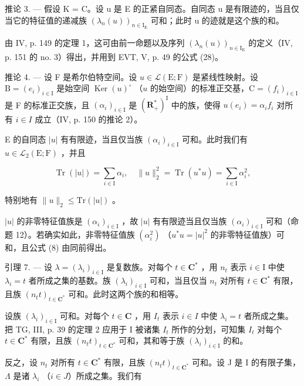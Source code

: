 推论 3. --- 假设 K = C。设 u 是 E 的正紧自同态。自同态 u 是有限迹的，当且仅当它的特征值的递减族 \((\lambda_{n}(u))_{n\in\mathrm{I}_{\mathrm{E}}}\) 可和；此时 u 的迹就是这个族的和。

由 IV, p. 149 的定理 1，这可由前一命题以及序列 \((\lambda_n(u))_{n\in \mathrm{I_E}}\) 的定义（IV, p. 151 的 no. 3）得出，并用到 EVT, V, p. 49 的公式 (28)。

推论 4. --- 设 F 是希尔伯特空间。设 \(u \in \mathcal{L}(\mathrm{E};\mathrm{F})\) 是紧线性映射。设 \(\mathrm{B} = (e_i)_{i \in \mathrm{I}}\) 是始空间 \(\operatorname{Ker}(u)^{\circ}\) （\(u\) 的始空间）的标准正交基，\(\mathrm{C} = (f_i)_{i \in \mathrm{I}}\) 是 F 的标准正交族，且 \((\alpha_{i})_{i\in\mathrm{I}}\) 是 \((\mathbf{R}_{+}^{*})^{\mathrm{I}}\) 中的族，使得 \(u(e_{i})=\alpha_{i}f_{i}\) 对所有 \(i\in I\) 成立（IV, p. 150 的推论 2）。

E 的自同态 \(|u|\) 有有限迹，当且仅当族 \((\alpha_{i})_{i\in \mathrm{I}}\) 可和。此时我们有 \(u\in \mathcal{L}_2(\mathrm{E};\mathrm{F})\) ，并且

\[
\operatorname{Tr} (| u |) = \sum_ {i \in \mathrm{I}} \alpha_ {i}, \quad \| u \| _ {2} ^ {2} = \operatorname{Tr} (u ^ {*} u) = \sum_ {i \in \mathrm{I}} \alpha_ {i} ^ {2},\tag{8}
\]

特别地有 \(\|u\|_{2}\leqslant\mathrm{Tr}(|u|)\) 。

\(|u|\) 的非零特征值族是 \((\alpha_{i})_{i\in \mathrm{I}}\) ，故 \(|u|\) 有有限迹当且仅当族 \((\alpha_{i})_{i\in \mathrm{I}}\) 可和（命题 12）。若确实如此，非零特征值族 \((\alpha_{i}^{2})\) （\(u^{*}u = |u|^{2}\) 的非零特征值族）可和，且公式 (8) 由同前得出。

引理 7. --- 设 \(\lambda = (\lambda_i)_{i \in \mathrm{I}}\) 是复数族。对每个 \(t \in \mathbf{C}^*\) ，用 \(n_t\) 表示 \(i \in \mathrm{I}\) 中使 \(\lambda_i = t\) 者所成之集的基数。族 \((\lambda_i)_{i \in \mathrm{I}}\) 可和，当且仅当 \(n_t\) 对所有 \(t \in \mathbf{C}^*\) 有限，且族 \((n_t t)_{t \in \mathbf{C}^*}\) 可和。此时这两个族的和相等。

设族 \((\lambda_{i})_{i\in\mathrm{I}}\) 可和。对每个 \(t\in\mathbf{C}\) ，用 \(I_{t}\) 表示 \(i\in I\) 中使 \(\lambda_{i}=t\) 者所成之集。把 TG, III, p. 39 的定理 2 应用于 I 被诸集 \(I_{t}\) 所作的分划，可知集 \(I_{t}\) 对每个 \(t\in\mathbf{C}^{*}\) 有限，且族 \((n_{t}t)_{t\in\mathbf{C}^{*}}\) 可和，其和等于族 \((\lambda_{i})_{i\in\mathrm{I}}\) 的和。

反之，设 \(n_{t}\) 对所有 \(t \in \mathbf{C}^{*}\) 有限，且族 \((n_{t}t)_{t \in \mathbf{C}^{*}}\) 可和。设 J 是 I 的有限子集，\(\Lambda\) 是诸 \(\lambda_{i}\) （\(i \in J\)）所成之集。我们有

